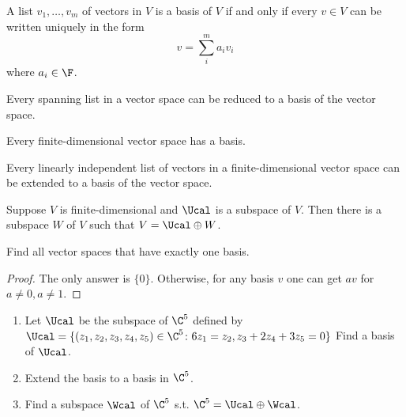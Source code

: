 \documentclass{extarticle}
\begin{document}
\begin{thm}
    A list \(v_1, \ldots, v_m\) of vectors in \(V\) is a basis of \(V\)
    if and only if every \(v \in V\) can be written uniquely in the form 
    \[v = \sum_i^m a_i v_i\]
    where \(a_i \in \F\).
\end{thm}

\begin{lemma}
    Every spanning list in a vector space can be reduced to a basis of the 
    vector space.
\end{lemma}

\begin{lemma}
    Every finite-dimensional vector space has a basis.
\end{lemma}

\begin{lemma}
    Every linearly independent list of vectors in a finite-dimensional vector 
    space can be extended to a basis of the vector space. 
\end{lemma}

\begin{lemma}
    Suppose \(V\) is finite-dimensional and \(\Ucal\) is a subspace of \(V\). 
    Then there is a subspace \(W\) of \(V\) such that \(V = \Ucal \oplus W\).
\end{lemma}

\newpage 
{}

\begin{problem}{1}
    Find all vector spaces that have exactly one basis.
\end{problem}

\begin{proof}
The only answer is \(\{0\}\). Otherwise, for any basis \(v\) one can get 
\(av\) for \(a \neq 0, a \neq 1\).
\end{proof}

\begin{problem}{4}
    \begin{enumerate}
        \item Let \(\Ucal\) be the subspace of \(\C^5\) defined by 
        \(\Ucal = \{(z_1, z_2, z_3, z_4, z_5) \in \C^5 \colon 6z_1 = z_2
        , z_3 + 2z_4 + 3z_5 = 0\}\)
        Find a basis of \(\Ucal\).
        \item Extend the basis to a basis in \(\C^5\).
        \item Find a subspace \(\Wcal\) of \(\C^5\) s.t. \(\C^5 = \Ucal \oplus \Wcal\).
    \end{enumerate}
\end{problem}
\end{document}
